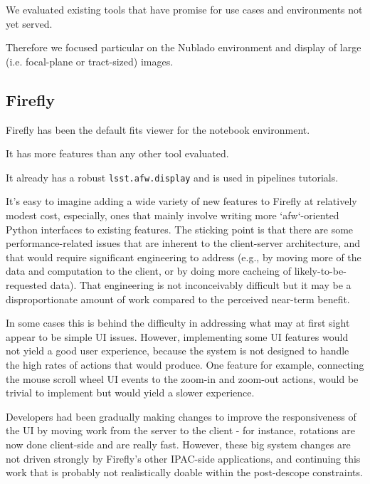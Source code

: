
We evaluated existing tools that have promise for use cases and environments not yet served.

Therefore we focused particular on the Nublado environment and display of large (i.e. focal-plane or tract-sized) images.


\subsection{Firefly}

Firefly has been the default fits viewer for the notebook environment.

It has more features than any other tool evaluated.

It already has a robust \texttt{lsst.afw.display} and is used in pipelines tutorials.

It's easy to imagine adding a wide variety of new features to Firefly at relatively modest cost, especially, ones that mainly involve writing more `afw`-oriented Python interfaces to existing features.
The sticking point is that there are some performance-related issues that are inherent to the client-server architecture, and that would require significant engineering to address (e.g., by moving more of the data and computation to the client, or by doing more cacheing of likely-to-be-requested data).
That engineering is not inconceivably difficult  but it may be a disproportionate amount of work compared to the perceived near-term benefit.

In some cases this is behind the difficulty in addressing what may at first sight appear to be simple UI issues.
However, implementing some UI features would not yield a good user experience, because the system is not designed to handle the high rates of actions that would produce.
One feature for example, connecting the mouse scroll wheel UI events to the zoom-in and zoom-out actions, would be trivial to implement but would yield a slower experience.

Developers had been gradually making changes to improve the responsiveness of the UI by moving work from the server to the client - for instance, rotations are now done client-side and are really fast.
However, these big system changes are not driven strongly by Firefly's other IPAC-side applications, and continuing this work that is probably not realistically doable within the post-descope constraints.


